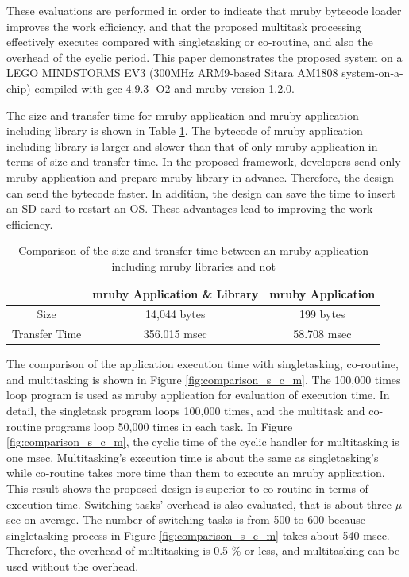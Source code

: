 \documentclass[conference,compsoc]{IEEEtran}
\begin{document}
These evaluations are performed in order to indicate that mruby bytecode loader improves the work efficiency, and that the proposed multitask processing effectively executes compared with singletasking or co-routine, and also the overhead of the cyclic period.
This paper demonstrates the proposed system on a LEGO MINDSTORMS EV3 (300MHz ARM9-based Sitara AM1808 system-on-a-chip) compiled with gcc 4.9.3 -O2 and mruby version 1.2.0.

The size and transfer time for mruby application and mruby application including library is shown in Table \ref{tab:size_and_time}.
The bytecode of mruby application including library is larger and slower than that of only mruby application in terms of size and transfer time.
In the proposed framework, developers send only mruby application and prepare mruby library in advance.
Therefore, the design can send the bytecode faster.
In addition, the design can save the time to insert an SD card to restart an OS.
These advantages lead to improving the work efficiency.

\begin{table}[t]
    \centering
    \caption{Comparison of the size and transfer time between an mruby application including mruby libraries and not}
    \begin{tabular}{c||c|c}
                        & mruby Application \& Library & mruby Application  \\ \hline
          Size          & 14,044 bytes                 & 199 bytes          \\ %
          Transfer Time & 356.015 msec                 & 58.708 msec        \\
    \end{tabular}
    \label{tab:size_and_time}
\end{table}

The comparison of the application execution time with singletasking, co-routine, and multitasking is shown in Figure \ref{fig:comparison_s_c_m}.
The 100,000 times loop program is used as mruby application for evaluation of execution time.
In detail, the singletask program loops 100,000 times, and the multitask and co-routine programs loop 50,000 times in each task.
In Figure \ref{fig:comparison_s_c_m}, the cyclic time of the cyclic handler for multitasking is one msec.
Multitasking's execution time is about the same as singletasking's while co-routine takes more time than them to execute an mruby application.
This result shows the proposed design is superior to co-routine in terms of execution time.
Switching tasks' overhead is also evaluated, that is about three $\mu$sec on average.
The number of switching tasks is from 500 to 600 because singletasking process in Figure \ref{fig:comparison_s_c_m} takes about 540 msec.
Therefore, the overhead of multitasking is 0.5 \% or less, and multitasking can be used without the overhead.
\end{document}
